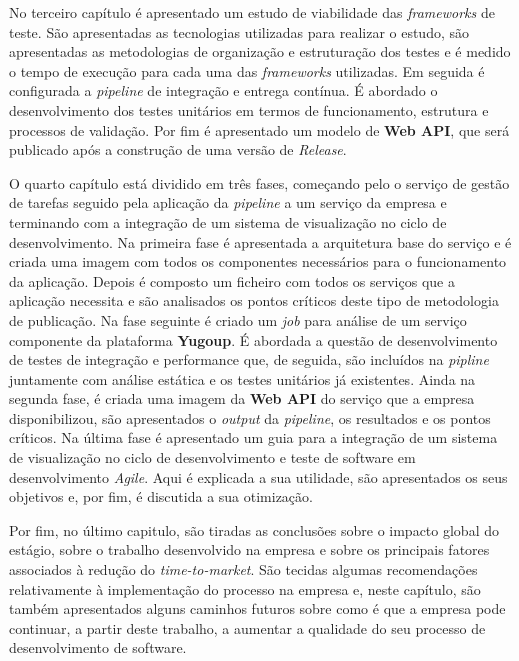 \hspace{1cm}No terceiro capítulo é apresentado um estudo de viabilidade das \textit{frameworks} de teste. São apresentadas as tecnologias utilizadas para realizar o estudo, são apresentadas as metodologias de organização e estruturação dos testes e é medido o tempo de execução para cada uma das \textit{frameworks} utilizadas. Em seguida é configurada a \textit{pipeline} de integração e entrega contínua. É abordado o desenvolvimento dos testes unitários em termos de funcionamento, estrutura e processos de validação. Por fim é apresentado um modelo de \textbf{Web API}, que será publicado após a construção de uma versão de \textit{Release}.

\hspace{1cm}O quarto capítulo está dividido em três fases, começando pelo o serviço de gestão de tarefas seguido pela aplicação da \textit{pipeline} a um serviço da empresa e terminando com a integração de um sistema de visualização no ciclo de desenvolvimento. Na primeira fase é apresentada a arquitetura base do serviço e é criada uma imagem com todos os componentes necessários para o funcionamento da aplicação. Depois é composto um ficheiro com todos os serviços que a aplicação necessita e são analisados os pontos críticos deste tipo de metodologia de publicação. Na fase seguinte é criado um \textit{job} para análise de um serviço componente da plataforma \textbf{Yugoup}. É abordada a questão de desenvolvimento de testes de integração e performance que, de seguida, são incluídos na \textit{pipline} juntamente com análise estática e os testes unitários já existentes. Ainda na segunda fase, é criada uma imagem da \textbf{Web API} do serviço que a empresa disponibilizou, são apresentados o \textit{output} da \textit{pipeline}, os resultados e os pontos críticos. Na última fase é apresentado um guia para a integração de um sistema de visualização no ciclo de desenvolvimento e teste de software em desenvolvimento \textit{Agile}. Aqui é explicada a sua utilidade, são apresentados os seus objetivos e, por fim, é discutida a sua otimização.

\hspace{1cm}Por fim, no último capitulo, são tiradas as conclusões sobre o impacto global do estágio, sobre o trabalho desenvolvido na empresa e sobre os principais fatores associados à redução do \textit{time-to-market}. São tecidas algumas recomendações relativamente à implementação do processo na empresa e, neste capítulo, são também apresentados alguns caminhos futuros sobre como é que a empresa pode continuar, a partir deste trabalho, a aumentar a qualidade do seu processo de desenvolvimento de software.

